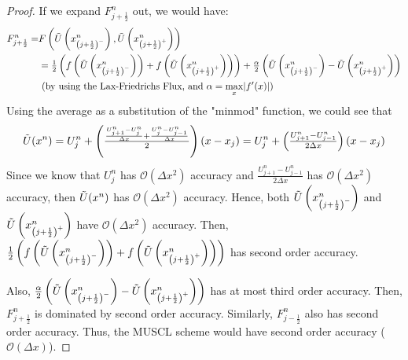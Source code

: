 \begin{answer}
\begin{proof}
        If we expand $F_{j+\frac{1}{2}}^n$ out, we would have:
        \begin{equation}
            \begin{aligned}
                F_{j+\frac{1}{2}}^n = &F\left(\Tilde{U}\left(x_{\left(j+\frac{1}{2}\right)^-}^n\right),\Tilde{U}\left(x_{\left(j+\frac{1}{2}\right)^+}^n\right)\right)\\
                &= \tfrac{1}{2}\left(f\left(\Tilde{U}\left(x_{\left(j+\frac{1}{2}\right)^-}^n\right)\right) + f\left(\Tilde{U}\left(x_{\left(j+\frac{1}{2}\right)^+}^n\right)\right)\right) + \tfrac{\alpha}{2}\left(\Tilde{U}\left(x_{\left(j+\frac{1}{2}\right)^-}^n\right) - \Tilde{U}\left(x_{\left(j+\frac{1}{2}\right)^+}^n\right)\right)\\
                &\text{ (by using the Lax-Friedrichs Flux, and $\alpha = \max_{x}\lvert f'(x)\rvert$)}
            \end{aligned}
        \end{equation}
        Using the average as a substitution of the "minmod" function, we could see that
        \begin{equation}
            \Tilde{U}(x^n) = U_j^n + \left(\tfrac{\frac{U_{j+1}^n-U_{j}^{n}}{\Delta x} + \frac{U_{j}^n-U_{j-1}^{n}}{\Delta x}}{2}\right)(x-x_j) = U_j^n + \left(\tfrac{U_{j+1}^n-U_{j-1}^{n}}{2\Delta x}\right)(x-x_j)
        \end{equation}
        Since we know that $U_j^n$ has $\mathcal{O}(\Delta x^2)$ accuracy and $\tfrac{U_{j+1}^n-U_{j-1}^{n}}{2\Delta x}$ has $\mathcal{O}(\Delta x^2)$ accuracy, then $\Tilde{U}(x^n)$ has $\mathcal{O}(\Delta x^2)$ accuracy. Hence, both $\Tilde{U}\left(x_{\left(j+\frac{1}{2}\right)^-}^n\right)$ and $\Tilde{U}\left(x_{\left(j+\frac{1}{2}\right)^+}^n\right)$ have $\mathcal{O}(\Delta x^2)$ accuracy. Then, $\tfrac{1}{2}\left(f\left(\Tilde{U}\left(x_{\left(j+\frac{1}{2}\right)^-}^n\right)\right) + f\left(\Tilde{U}\left(x_{\left(j+\frac{1}{2}\right)^+}^n\right)\right)\right)$ has second order accuracy. 
        
        Also, $\tfrac{\alpha}{2}\left(\Tilde{U}\left(x_{\left(j+\frac{1}{2}\right)^-}^n\right) - \Tilde{U}\left(x_{\left(j+\frac{1}{2}\right)^+}^n\right)\right)$ has at most third order accuracy. Then, $F_{j+\frac{1}{2}}^n$ is dominated by second order accuracy. Similarly, $F_{j-\frac{1}{2}}^n$ also has second order accuracy. Thus, the MUSCL scheme would have second order accuracy ($\mathcal{O}(\Delta x)$).
    \end{proof}
\end{answer}